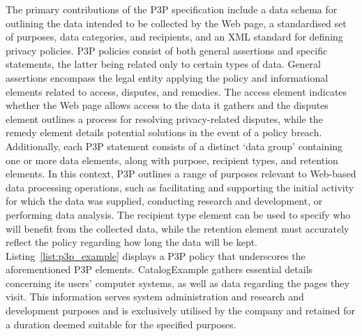 The primary contributions of the P3P specification include a data schema for outlining the data intended to be collected by the Web page, a standardised set of purposes, data categories, and recipients, and an XML standard for defining privacy policies.
P3P policies consist of both general assertions and specific statements, the latter being related only to certain types of data.
General assertions encompass the legal entity applying the policy and informational elements related to access, disputes, and remedies.
The access element indicates whether the Web page allows access to the data it gathers and the disputes element outlines a process for resolving privacy-related disputes, while the remedy element details potential solutions in the event of a policy breach.
Additionally, each P3P statement consists of a distinct `data group' containing one or more data elements, along with purpose, recipient types, and retention elements.
In this context, P3P outlines a range of purposes relevant to Web-based data processing operations, such as facilitating and supporting the initial activity for which the data was supplied, conducting research and development, or performing data analysis.
The recipient type element can be used to specify who will benefit from the collected data, while the retention element must accurately reflect the policy regarding how long the data will be kept.
Listing~\ref{list:p3p_example} displays a P3P policy that underscores the aforementioned P3P elements.
CatalogExample gathers essential details concerning its users' computer systems, as well as data regarding the pages they visit.
This information serves system administration and research and development purposes and is exclusively utilised by the company and retained for a duration deemed suitable for the specified purposes.

